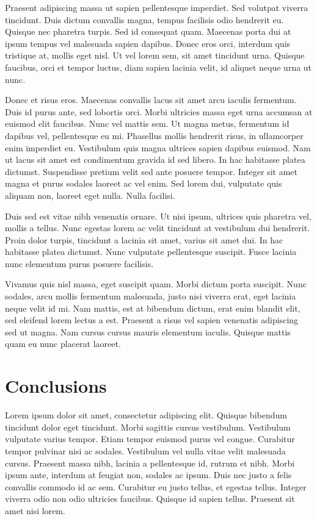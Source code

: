 \documentclass[12pt]{report}
\begin{document}
Praesent adipiscing massa ut sapien pellentesque imperdiet. Sed volutpat viverra tincidunt. Duis dictum convallis magna, tempus facilisis odio hendrerit eu. Quisque nec pharetra turpis. Sed id consequat quam. Maecenas porta dui at ipsum tempus vel malesuada sapien dapibus. Donec eros orci, interdum quis tristique at, mollis eget nisl. Ut vel lorem sem, sit amet tincidunt urna. Quisque faucibus, orci et tempor luctus, diam sapien lacinia velit, id aliquet neque urna ut nunc.

Donec et risus eros. Maecenas convallis lacus sit amet arcu iaculis fermentum. Duis id purus ante, sed lobortis orci. Morbi ultricies massa eget urna accumsan at euismod elit faucibus. Nunc vel mattis sem. Ut magna metus, fermentum id dapibus vel, pellentesque eu mi. Phasellus mollis hendrerit risus, in ullamcorper enim imperdiet eu. Vestibulum quis magna ultrices sapien dapibus euismod. Nam ut lacus sit amet est condimentum gravida id sed libero. In hac habitasse platea dictumst. Suspendisse pretium velit sed ante posuere tempor. Integer sit amet magna et purus sodales laoreet ac vel enim. Sed lorem dui, vulputate quis aliquam non, laoreet eget nulla. Nulla facilisi.

Duis sed est vitae nibh venenatis ornare. Ut nisi ipsum, ultrices quis pharetra vel, mollis a tellus. Nunc egestas lorem ac velit tincidunt at vestibulum dui hendrerit. Proin dolor turpis, tincidunt a lacinia sit amet, varius sit amet dui. In hac habitasse platea dictumst. Nunc vulputate pellentesque suscipit. Fusce lacinia nunc elementum purus posuere facilisis.

Vivamus quis nisl massa, eget suscipit quam. Morbi dictum porta suscipit. Nunc sodales, arcu mollis fermentum malesuada, justo nisi viverra erat, eget lacinia neque velit id mi. Nam mattis, est at bibendum dictum, erat enim blandit elit, sed eleifend lorem lectus a est. Praesent a risus vel sapien venenatis adipiscing sed ut magna. Nam cursus cursus mauris elementum iaculis. Quisque mattis quam eu nunc placerat laoreet.


\chapter{Conclusions}\label{chap:conclusions}
Lorem ipsum dolor sit amet, consectetur adipiscing elit. Quisque bibendum tincidunt dolor eget tincidunt. Morbi sagittis cursus vestibulum. Vestibulum vulputate varius tempor. Etiam tempor euismod purus vel congue. Curabitur tempor pulvinar nisi ac sodales. Vestibulum vel nulla vitae velit malesuada cursus. Praesent massa nibh, lacinia a pellentesque id, rutrum et nibh. Morbi ipsum ante, interdum at feugiat non, sodales ac ipsum. Duis nec justo a felis convallis commodo id ac sem. Curabitur eu justo tellus, et egestas tellus. Integer viverra odio non odio ultricies faucibus. Quisque id sapien tellus. Praesent sit amet nisi lorem.
\end{document}
